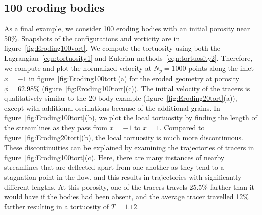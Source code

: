 \documentclass{jfm}
\begin{document}
\subsection{100 eroding bodies}
\label{sec:Eroding100}
As a final example, we consider 100 eroding bodies with an initial
porosity near 50\%.  Snapshots of the configurations and vorticity are
in figure~\ref{fig:Eroding100vort}. We compute the tortuosity using both
the Lagrangian~\eqref{eqn:tortuosity1} and Eulerian
methods~\eqref{eqn:tortuosity2}. Therefore, we compute and plot the
normalized velocity at $N_p = 1000$ points along the inlet $x=-1$ in
figure~\ref{fig:Eroding100tort}(a) for the eroded geometry at porosity
$\phi = 62.98\%$ (figure~\ref{fig:Eroding100tort}(c)).  The initial
velocity of the tracers is qualitatively similar to the 20 body example
(figure~\ref{fig:Eroding20tort}(a)), except with additional oscillations
because of the additional grains.  In
figure~\ref{fig:Eroding100tort}(b), we plot the local tortuosity by
finding the length of the streamlines as they pass from $x=-1$ to $x=1$.
Compared to figure~\ref{fig:Eroding20tort}(b), the local tortuosity is
much more discontinuous.  These discontinuities can be explained by
examining the trajectories of tracers in
figure~\ref{fig:Eroding100tort}(c).  Here, there are many instances of
nearby streamlines that are deflected apart from one another as they
tend to a stagnation point in the flow, and this results in trajectories
with significantly different lengths.  At this porosity, one of the
tracers travels 25.5\% farther than it would have if the bodies had been
absent, and the average tracer travelled 12\% farther resulting in a
tortuosity of $T = 1.12$.
\end{document}
